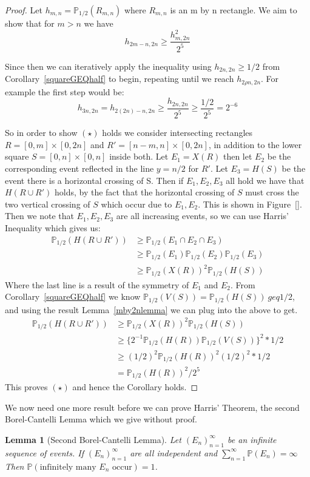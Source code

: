 \documentclass[a4paper,11pt]{article}
\newtheorem{lemma}[theorem]{Lemma}
\theoremstyle{definition}
\newcommand{\prbhlf}{\mathbb{P}_{1/2}}
\begin{document}
\begin{proof}
	Let $h_{m,n} = \mathbb{P}_{1/2}(R_{m,n})$ where $R_{m,n}$ is an m by n rectangle. We aim to show that for $m>n$ we have
	\[
		h_{2m-n,2n} \geq \frac{h_{m,2n}^2}{2^5} \tag{$\star$}
	\]
	
	Since then we can iteratively apply the inequality using ${h_{2n,2n} \geq 1/2}$ from Corollary~\ref*{squareGEQhalf} to begin, repeating until we reach $h_{2\rho n,2n}$. For example the first step would be:
	$$h_{3n,2n} =h_{2(2n) -n,2n} \geq \frac{h_{2n,2n}}{2^5} \geq \frac{1/2}{2^5} = 2^{-6}$$

	So in order to show $(\star)$ holds we consider intersecting rectangles $R = [0,m]\times [0,2n]$ and $R' = [n-m,n] \times [0,2n]$, in addition to the lower square $S = [0,n] \times [0,n]$ inside both.
	Let $E_1 = X(R)$ then let $E_2$ be the corresponding event reflected in the line $y=n/2$ for $R'$. Let $E_3 = H(S)$ be the event there is a horizontal crossing of S.
	Then if $E_1,E_2,E_3$ all hold we have that $H(R \cup  R')$ holds, by the fact that the horizontal crossing of $S$ must cross the two vertical crossing of $S$ which occur due to $E_1,E_2$. This is shown in Figure~\ref{}.
	Then we note that $E_1,E_2,E_3$ are all increasing events, so we can use Harris' Inequality which gives us:
	\begin{align*}
	\prbhlf(H(R \cup R')) &\geq \prbhlf(E_1 \cap E_2\cap E_3)\\
	& \geq \prbhlf(E_1)\prbhlf(E_2)\prbhlf(E_3)\\
	& \geq \prbhlf(X(R))^2\prbhlf(H(S))
	\end{align*}
	Where the last line is a result of the symmetry of $E_1$ and $E_2$. From Corollary~\ref{squareGEQhalf} we know $\prbhlf(V(S)) =\prbhlf(H(S)) \ geq 1/2$, and using the result Lemma~\ref{mby2nlemma} we can plug into the above to get.
	\begin{align*}
		\prbhlf(H(R \cup R')) & \geq \prbhlf(X(R))^2\prbhlf(H(S)) \\
		& \geq \{2^{-1} \prbhlf (H(R)) \prbhlf (V(S))\}^2*1/2 \\
		& \geq (1/2)^2 \prbhlf(H(R))^2(1/2)^2*1/2 \\
		& = \prbhlf(H(R))^2/2^5
	\end{align*}
	This proves $(\star)$ and hence the Corollary holds. 
\end{proof}

We now need one more result before we can prove Harris' Theorem, the second Borel-Cantelli Lemma which we give without proof. 
\begin{lemma}[Second Borel-Cantelli Lemma]
	Let $(E_n)_{n=1}^\infty$ be an infinite sequence of events. If $(E_n)_{n=1}^\infty$ are all independent and $\sum_{n=1}^{\infty} \mathbb{P}(E_n) = \infty$ Then $\mathbb{P}(\text{infinitely many }E_n\text{ occur}) = 1$.
\end{lemma}
\end{document}
